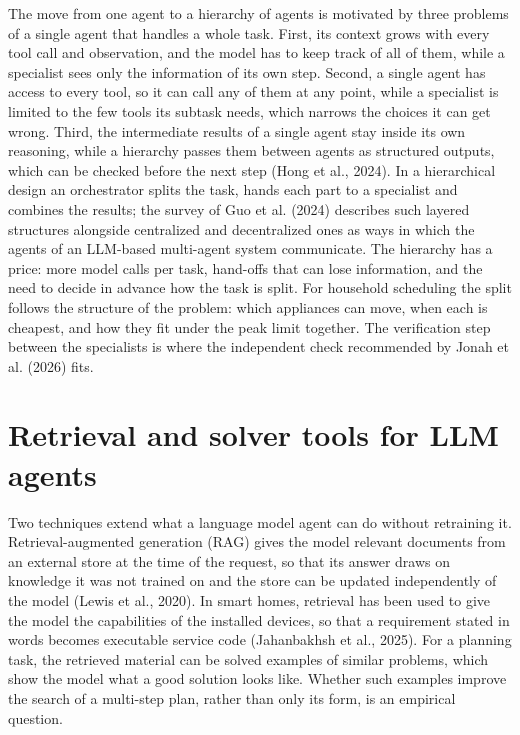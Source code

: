 \documentclass[12pt,a4paper]{report}
\begin{document}
The move from one agent to a hierarchy of agents is motivated by three
problems of a single agent that handles a whole task. First, its context
grows with every tool call and observation, and the model has to keep
track of all of them, while a specialist sees only the information of
its own step. Second, a single agent has access to every tool, so it can
call any of them at any point, while a specialist is limited to the few
tools its subtask needs, which narrows the choices it can get wrong.
Third, the intermediate results of a single agent stay inside its own
reasoning, while a hierarchy passes them between agents as structured
outputs, which can be checked before the next step (Hong et al., 2024).
In a hierarchical design an orchestrator splits the task, hands each part
to a specialist and combines the results; the survey of Guo et al.
(2024) describes such layered structures alongside centralized and
decentralized ones as ways in which the agents of an LLM-based
multi-agent system communicate. The hierarchy has a
price: more model calls per task, hand-offs that can lose information,
and the need to decide in advance how the task is split. For household
scheduling the split follows the structure of the problem: which
appliances can move, when each is cheapest, and how they fit under the
peak limit together. The verification step between the specialists is
where the independent check recommended by Jonah et al. (2026) fits.

\section{Retrieval and solver tools for LLM agents}
\label{sec:rag-lit}

Two techniques extend what a language model agent can do without
retraining it. Retrieval-augmented generation (RAG) gives the model
relevant documents from an external store at the time of the request,
so that its answer draws on knowledge it was not trained on and the
store can be updated independently of the model (Lewis et al., 2020).
In smart homes, retrieval has been used to give the model the
capabilities of the installed devices, so that a requirement stated in
words becomes executable service code (Jahanbakhsh et al., 2025).
For a planning task, the retrieved material can be solved examples of
similar problems, which show the model what a good solution looks like.
Whether such examples improve the search of a multi-step plan, rather
than only its form, is an empirical question.
\end{document}
